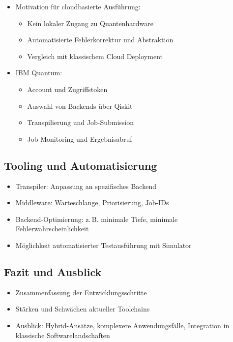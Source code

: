 \begin{itemize}
    \item Motivation für cloudbasierte Ausführung:
    \begin{itemize}
        \item Kein lokaler Zugang zu Quantenhardware
        \item Automatisierte Fehlerkorrektur und Abstraktion
        \item Vergleich mit klassischem Cloud Deployment
    \end{itemize}
    \item IBM Quantum:
    \begin{itemize}
        \item Account und Zugriffstoken
        \item Auswahl von Backends über Qiskit
        \item Transpilierung und Job-Submission
        \item Job-Monitoring und Ergebnisabruf
    \end{itemize}
\end{itemize}


\subsection{Tooling und Automatisierung}
\begin{itemize}
    \item Transpiler: Anpassung an spezifisches Backend
    \item Middleware: Warteschlange, Priorisierung, Job-IDs
    \item Backend-Optimierung: z.\,B. minimale Tiefe, minimale Fehlerwahrscheinlichkeit
    \item Möglichkeit automatisierter Testausführung mit Simulator
\end{itemize}

\subsection{Fazit und Ausblick}
\begin{itemize}
    \item Zusammenfassung der Entwicklungsschritte
    \item Stärken und Schwächen aktueller Toolchains
    \item Ausblick: Hybrid-Ansätze, komplexere Anwendungsfälle, Integration in klassische Softwarelandschaften
\end{itemize}

\printbibliography
